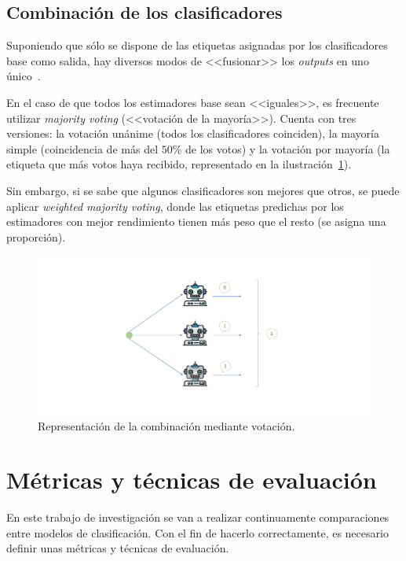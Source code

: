 \subsection{Combinación de los clasificadores}

Suponiendo que sólo se dispone de las etiquetas asignadas por los clasificadores base como salida, hay diversos modos de <<fusionar>> los \textit{outputs} en uno único~\cite{ensembles2006robi}.

En el caso de que todos los estimadores base sean <<iguales>>, es frecuente utilizar \textit{majority voting} (<<votación de la mayoría>>). Cuenta con tres versiones: la votación unánime (todos los clasificadores coinciden), la mayoría simple (coincidencia de más del $50\%$ de los votos) y la votación por mayoría (la etiqueta que más votos haya recibido, representado en la ilustración~\ref{img:voting}).

Sin embargo, si se sabe que algunos clasificadores son mejores que otros, se puede aplicar \textit{weighted majority voting}, donde las etiquetas predichas por los estimadores con mejor rendimiento tienen más peso que el resto (se asigna una proporción).

\begin{figure}[h]
	\caption[\textit{Ensembles}: Combinación mediante votación]{Representación de la combinación mediante votación.}
	\label{img:voting}
	\centering
	\includegraphics[scale=0.5]{../img/memoria/3_voting.pdf}
\end{figure}



\section{Métricas y técnicas de evaluación}

En este trabajo de investigación se van a realizar continuamente comparaciones entre modelos de clasificación. Con el fin de hacerlo correctamente, es necesario definir unas métricas y técnicas de evaluación. 

